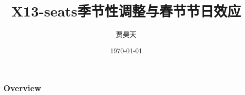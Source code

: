 \documentclass{beamer}
\title[季调]{X13-seats季节性调整与春节节日效应} %
\author{贾昊天} %
\institute[Tsinghua University] %
{
中国国际金融股份有限公司 \\ %
\medskip
\textit{Haotian.Jia@cicc.com.cn} %
}
\date{\today} %
\begin{document}
\begin{frame}
\titlepage %
\end{frame}

\begin{frame}
\frametitle{Overview} %
\tableofcontents %
\end{frame}

\end{document}
